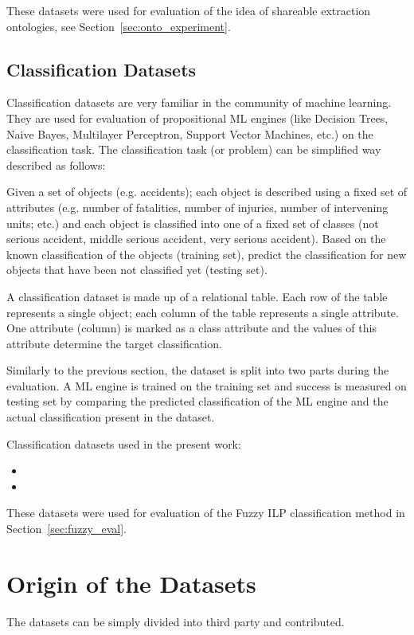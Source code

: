These datasets were used for evaluation of the idea of shareable extraction ontologies, see Section~\ref{sec:onto_experiment}. 


\subsection{Classification Datasets}
Classification datasets are very familiar in the community of machine learning. They are used for evaluation of propositional ML engines (like Decision Trees, Naive Bayes, Multilayer Perceptron, Support Vector Machines, etc.) on the classification task. The classification task (or problem) can be simplified way described as follows: 

Given a set of objects (e.g. accidents); each object is described using a fixed set of attributes (e.g. number of fatalities, number of injuries, number of intervening units; etc.) and each object is classified into one of a fixed set of classes (not serious accident, middle serious accident, very serious accident). Based on the known classification of the objects (training set), predict the classification for new objects that have been not classified yet (testing set). 

A classification dataset is made up of a relational table. Each row of the table represents a single object; each column of the table represents a single attribute. One attribute (column) is marked as a class attribute and the values of this attribute determine the target classification. 

Similarly to the previous section, the dataset is split into two parts during the evaluation. A ML engine is trained on the training set and success is measured on testing set by comparing the predicted classification of the ML engine and the actual classification present in the dataset.

Classification datasets used in the present work:
\begin{itemize}
	\item {}
	\item {}
\end{itemize}

These datasets were used for evaluation of the Fuzzy ILP classification method in Section~\ref{sec:fuzzy_eval}. 




\section{Origin of the Datasets}
The datasets can be simply divided into third party and contributed. 

